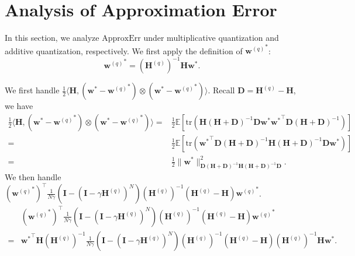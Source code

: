 \documentclass[11pt, letterpaper]{article}
\begin{document}
\section{Analysis of Approximation Error}
\label{analyze R4}
In this section, we analyze $\mathrm{ApproxErr}$ under multiplicative quantization and additive quantization, respectively. We first apply the definition of ${\mathbf{w}^{(q)}}^*$:
\begin{equation*}
        {\mathbf{w}^{(q)}}^*=(\mathbf{H}^{(q)})^{-1}\mathbf{H}\mathbf{w}^*.
\end{equation*}

We first handle $\frac{1}{2}\langle\mathbf{H},({\mathbf{w}}^*-{\mathbf{w}^{(q)}}^*)\otimes({\mathbf{w}}^*-{\mathbf{w}^{(q)}}^*)\rangle$. Recall $\mathbf{D}=\mathbf{H}^{(q)}-\mathbf{H}$, we have
\begin{equation}
    \label{eq: b1}
    \begin{aligned}
            \frac{1}{2}\langle\mathbf{H},({\mathbf{w}}^*-{\mathbf{w}^{(q)}}^*)\otimes({\mathbf{w}}^*-{\mathbf{w}^{(q)}}^*)\rangle=&\frac{1}{2}\mathbb{E}\left[\mathrm{tr}\left(\mathbf{H}(\mathbf{H}+\mathbf{D})^{-1}\mathbf{D}\mathbf{w}^*{\mathbf{w}^*}^\top\mathbf{D}(\mathbf{H}+\mathbf{D})^{-1}\right)\right]\\
            =&\frac{1}{2}\mathbb{E}\left[\mathrm{tr}\left({\mathbf{w}^*}^\top\mathbf{D}(\mathbf{H}+\mathbf{D})^{-1}\mathbf{H}(\mathbf{H}+\mathbf{D})^{-1}\mathbf{D}\mathbf{w}^*\right)\right]\\
            =&\frac{1}{2}\|\mathbf{w}^*\|_{\mathbf{D}(\mathbf{H}+\mathbf{D})^{-1}\mathbf{H}(\mathbf{H}+\mathbf{D})^{-1}\mathbf{D}}^2.
    \end{aligned}
\end{equation}
We then handle $\left({\mathbf{w}^{(q)}}^*\right)^\top\frac{1}{N\gamma}\left(\mathbf{I}-(\mathbf{I}-\gamma\mathbf{H}^{(q)})^N\right)(\mathbf{H}^{(q)})^{-1}\left(\mathbf{H}^{(q)}-\mathbf{H}\right){\mathbf{w}^{(q)}}^*$.
\begin{equation}
    \label{eq: b2}
    \begin{aligned}
            &\left({\mathbf{w}^{(q)}}^*\right)^\top\frac{1}{N\gamma}\left(\mathbf{I}-(\mathbf{I}-\gamma\mathbf{H}^{(q)})^N\right)(\mathbf{H}^{(q)})^{-1}\left(\mathbf{H}^{(q)}-\mathbf{H}\right){\mathbf{w}^{(q)}}^*\\
            =&{\mathbf{w}^*}^\top \mathbf{H}(\mathbf{H}^{(q)})^{-1}\frac{1}{N\gamma}\left(\mathbf{I}-(\mathbf{I}-\gamma\mathbf{H}^{(q)})^N\right)(\mathbf{H}^{(q)})^{-1}\left(\mathbf{H}^{(q)}-\mathbf{H}\right)(\mathbf{H}^{(q)})^{-1}\mathbf{H}\mathbf{w}^*.
    \end{aligned}
\end{equation}
\end{document}
